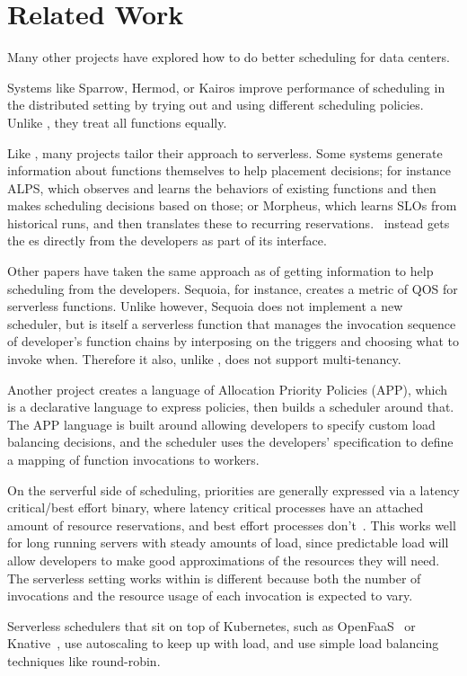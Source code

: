 \section{Related Work}

Many other projects have explored how to do better scheduling for data centers.
 
Systems like Sparrow\cite{sparrow}, Hermod\cite{hermod}, or Kairos\cite{kairos}
improve performance of scheduling in the distributed setting by trying out and
using different scheduling policies. Unlike \sys{}, they treat all functions
equally.

Like \sys{}, many projects tailor their approach to serverless. Some systems
generate information about functions themselves to help placement decisions; for
instance ALPS\cite{alps}, which observes and learns the behaviors of existing
functions and then makes scheduling decisions based on those; or
Morpheus\cite{morpheus}, which learns SLOs from historical runs, and then
translates these to recurring reservations.~\Sys{} instead gets the \class{}es
directly from the developers as part of its interface.

Other papers have taken the same approach as \sys{} of getting information to
help scheduling from the developers. Sequoia\cite{sequoia}, for instance,
creates a metric of QOS for serverless functions. Unlike \sys{} however, Sequoia
does not implement a new scheduler, but is itself a serverless function that
manages the invocation sequence of developer's function chains by interposing on
the triggers and choosing what to invoke when. Therefore it also, unlike
\sys{}, does not support multi-tenancy.

Another project\cite{app-paper} creates a language of Allocation Priority
Policies (APP), which is a declarative language to express policies, then builds
a scheduler around that. The APP language is built around allowing developers to
specify custom load balancing decisions, and the scheduler uses the developers'
specification to define a mapping of function invocations to workers. 

On the serverful side of scheduling, priorities are generally expressed via a
latency critical/best effort binary, where latency critical processes have an
attached amount of resource reservations, and best effort processes
don't~\cite{kubernetes-lc-be}. This works well for long running servers with
steady amounts of load, since predictable load will allow developers to make
good approximations of the resources they will need. The serverless setting
\sys{} works within is different because both the number of invocations and the
resource usage of each invocation is expected to vary. 

Serverless schedulers that sit on top of Kubernetes, such as
OpenFaaS~\cite{openfaas} or Knative~\cite{knative}, use autoscaling to keep up
with load, and use simple load balancing techniques like round-robin.
